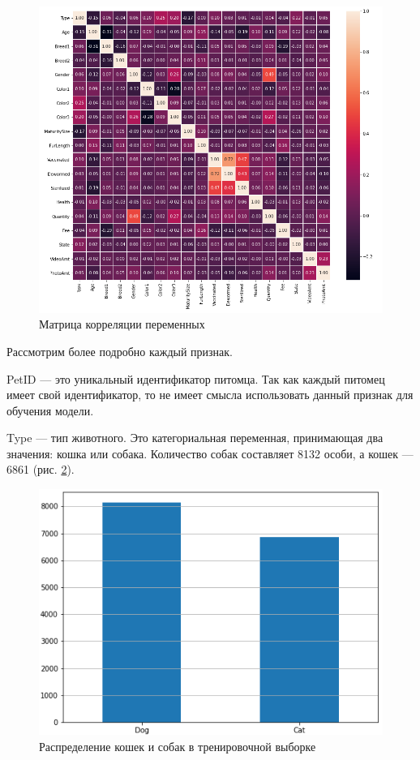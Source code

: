 \documentclass[14pt]{mmcs_article}
\begin{document}
\begin{figure}[H]
	\centering
	\includegraphics[scale=0.55]{corr.png}
	\caption{Матрица корреляции переменных}\label{analyse:corr}
\end{figure}

Рассмотрим более подробно каждый признак.

PetID --- это уникальный идентификатор питомца. Так как каждый питомец имеет свой идентификатор, то не имеет смысла использовать данный признак для обучения модели.

Type --- тип животного. Это категориальная переменная, принимающая два значения: кошка или собака. Количество собак составляет 8132 особи, а кошек — 6861 (рис. \ref{analyse:type}).

\begin{figure}[H]
	\centering
	\includegraphics[scale=1.2]{type.png}
	\caption{Распределение кошек и собак в тренировочной выборке}\label{analyse:type}
\end{figure}
\end{document}
